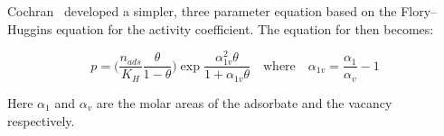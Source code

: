Cochran~\cite{cochranVacancySolutionTheory1985}
developed a simpler, three parameter equation based on
the Flory–Huggins equation for the activity coefficient.
The equation for then becomes:

\begin{equation}\label{pyg:eqn:fhvst}
	p = \bigg( \frac{n_{ads}}{K_H} \frac{\theta}{1-\theta} \bigg)
	\exp{\frac{\alpha^2_{1v}\theta}{1+\alpha_{1v}\theta}}
	\quad \text{where} \quad
	\alpha_{1v} = \frac{\alpha_{1}}{\alpha_{v}} - 1
\end{equation}

Here \(\alpha_{1}\) and \(\alpha_{v}\) are the molar areas of the
adsorbate
and the vacancy respectively.
